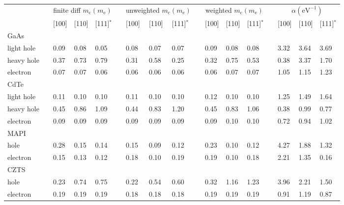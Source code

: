 \begin{landscape}
\newcommand{\ra}[1]{\renewcommand{\arraystretch}{#1}}
\begin{table}[tb]\centering
\ra{1.3}
\begin{tabular}{@{}lclllclllclllclll@{}}\toprule
& \phantom{abc}&\multicolumn{3}{c}{finite diff $m_\text{c}\left(m_{\text{e}}\right)$} & \phantom{abc}& \multicolumn{3}{c}{unweighted $m_\text{c}\left(m_{\text{e}}\right)$} &\phantom{abc} & \multicolumn{3}{c}{weighted $m_\text{c}\left(m_{\text{e}}\right)$} & \phantom{abc} & \multicolumn{3}{c}{$\alpha \left(\mathrm{eV}^{-1}\right)$}\\
\cline{3-5} \cline{7-9} \cline{11-13} \cline{15-17}
&& [100] & [110] & [111]$^*$  && [100] & [110] & [111]$^*$   && [100] & [110] & [111]$^*$   && [100] & [110] & [111]$^*$  \\ 
GaAs\\
light hole 
&& 0.09 & 0.08 & 0.05        &&  0.08    & 0.07  & 0.07     && 0.09 & 0.08 & 0.08     && 3.32 & 3.64 & 3.69  \\
heavy hole 
&& 0.37 & 0.73 & 0.79        &&  0.31    & 0.58  & 0.25     && 0.32 & 0.75 & 0.53     && 0.38 & 3.37 & 1.70  \\
electron 
&& 0.07 & 0.07 & 0.06        &&  0.06    & 0.06  & 0.06     && 0.06 & 0.07 & 0.07     && 1.05 & 1.15 & 1.23  \\
CdTe\\
light hole 
&& 0.11 & 0.10 & 0.10        &&  0.11    & 0.10  & 0.10     && 0.12 & 0.10 & 0.10     && 1.25 & 1.49 & 1.64  \\
heavy hole 
&& 0.45 & 0.86 & 1.09        &&  0.44    & 0.83  & 1.20     && 0.45 & 0.83 & 1.06     && 0.38 & 0.99 & 0.77  \\
electron 
&& 0.09 & 0.09 & 0.09        &&  0.09    & 0.09  & 0.09     && 0.09 & 0.10 & 0.10     && 0.72 & 0.94 & 1.02  \\
MAPI\\
hole 
&& 0.28 & 0.15 & 0.14        &&  0.15    & 0.09  & 0.12     && 0.23 & 0.10 & 0.12     && 4.27 & 1.88 & 1.32  \\
electron 
&& 0.15 & 0.13 & 0.12        &&  0.18    & 0.10  & 0.19     && 0.19 & 0.10 & 0.18     && 2.21 & 1.35 & 0.16  \\
CZTS\\
hole 
&& 0.23 & 0.74 & 0.75        &&  0.22    & 0.54  & 0.60     && 0.32 & 1.16 & 1.23     && 3.96 & 2.21 & 1.50  \\
electron 
&& 0.19 & 0.19 & 0.19        &&  0.18    & 0.18  & 0.18     && 0.19 & 0.19 & 0.19     && 0.91 & 1.19 & 0.87  \\


\end{tabular}
\end{table}
\end{landscape}
